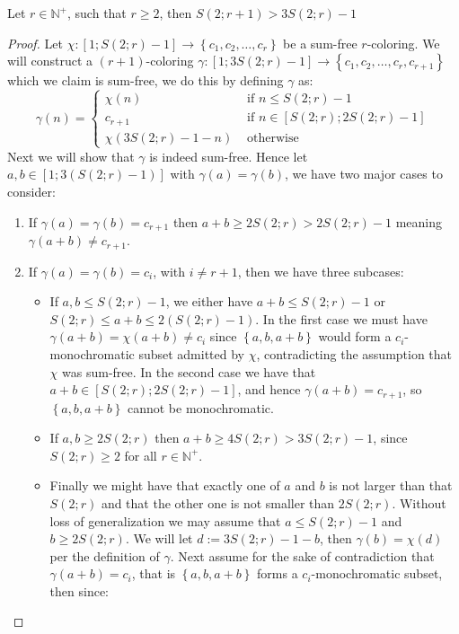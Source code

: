 \begin{proposition}\label{prop:schur_first_lower_bound}
	Let $r \in \mathbb{N}^{+}$, such that $r \geq 2$, then $S(2; r + 1) > 3S(2; r) - 1$
\end{proposition}
\begin{proof}
	Let $\chi: [1; S(2; r) - 1] \to \left\{c_1, c_2, \ldots, c_{r}\right\}$ be a sum-free $r$-coloring. We will construct a $(r + 1)$-coloring $\gamma: [1; 3S(2; r) - 1] \to \left\{c_1, c_2, \ldots, c_r, c_{r + 1}\right\}$ which we claim is sum-free, we do this by defining $\gamma$ as:
	\begin{equation*}
		\gamma(n) = \begin{cases}
			\chi(n)               & \text{ if }  n \leq S(2; r) - 1          \\
			c_{r + 1}             & \text{ if } n \in [S(2; r); 2S(2; r) - 1] \\
			\chi(3S(2; r) - 1 - n) & \text{ otherwise }
		\end{cases}
	\end{equation*}
	Next we will show that $\gamma$ is indeed sum-free. Hence let $a, b \in [1; 3(S(2; r) - 1)]$ with $\gamma(a) = \gamma(b)$, we have two major cases to consider:
	\begin{enumerate}
		\item If $\gamma(a) = \gamma(b) = c_{r + 1}$ then $a + b \geq 2S(2; r) > 2S(2; r) - 1$ meaning $\gamma(a + b) \neq c_{r + 1}$.
		\item If $\gamma(a) = \gamma(b) = c_{i}$, with $i \neq r + 1$, then we have three subcases:
		      \begin{itemize}
			      \item If $a, b \leq S(2; r) - 1$, we either have $a + b \leq S(2; r) - 1$ or $S(2; r) \leq a + b \leq 2(S(2; r) - 1)$. In the first case we must have $\gamma(a + b) = \chi(a + b) \neq c_{i}$ since $\left\{a, b, a + b\right\}$ would form a $c_i$-monochromatic subset admitted by $\chi$, contradicting the assumption that $\chi$ was sum-free. In the second case we have that $a + b \in [S(2; r); 2S(2; r) - 1]$, and hence $\gamma(a + b) = c_{r + 1}$, so $\left\{a, b,a + b\right\}$ cannot be monochromatic.
			      \item If $a, b \geq 2S(2; r)$ then $a + b \geq 4S(2; r) > 3S(2; r) - 1$, since $S(2; r) \geq 2$ for all $r \in \mathbb{N}^{+}$.
				\item Finally we might have that exactly one of $a$ and $b$ is not larger than that $S(2; r)$ and that the other one is not smaller than $2S(2;r)$. Without loss of generalization we may assume that $a \leq S(2; r) - 1$ and $b \geq 2S(2; r)$. We will let $d := 3S(2; r) - 1 - b$, then $\gamma(b) = \chi(d)$ per the definition of $\gamma$. Next assume for the sake of contradiction that $\gamma(a + b) = c_{i}$, that is $\left\{a, b, a + b\right\}$ forms a $c_i$-monochromatic subset, then since:

\end{itemize}
\end{enumerate}
\end{proof}
